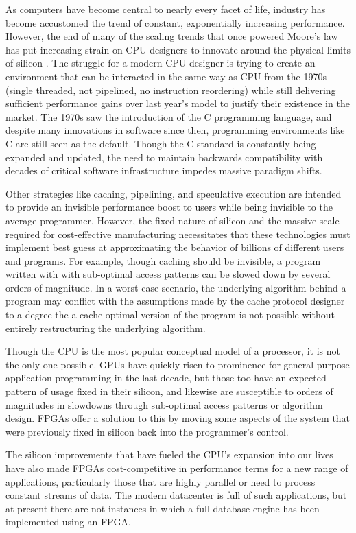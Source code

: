 
As computers have become central to nearly every facet of life, industry has
become accustomed the trend of constant, exponentially increasing performance.
However, the end of many of the scaling trends that once powered Moore's law has
put increasing strain on CPU designers to innovate around the physical limits of
silicon \autocite{dark-silicon}.
%
The struggle for a modern CPU designer is trying to create an environment that
can be interacted in the same way as CPU from the 1970s (single threaded, not
pipelined, no instruction reordering) while still delivering sufficient
performance gains over last year's model to justify their existence in the
market. The 1970s saw the introduction of the C programming language, and
despite many innovations in software since then, programming environments like C
are still seen as the default. Though the C standard is constantly being
expanded and updated, the need to maintain backwards compatibility with decades
of critical software infrastructure impedes massive paradigm shifts.

Other strategies like caching, pipelining, and speculative execution are
intended to provide an invisible performance boost to users while being
invisible to the average programmer. However, the fixed nature of silicon and
the massive scale required for cost-effective manufacturing necessitates that
these technologies must implement best guess at approximating the behavior of
billions of different users and programs.
%
For example, though caching should be invisible, a program written with with
sub-optimal access patterns can be slowed down by several orders of magnitude.
In a worst case scenario, the underlying algorithm behind a program may conflict
with the assumptions made by the cache protocol designer to a degree the a
cache-optimal version of the program is not possible without entirely
restructuring the underlying algorithm.

Though the CPU is the most popular conceptual model of a processor, it is
not the only one possible. GPUs have quickly risen to prominence for general
purpose application programming in the last decade, but those too have an
expected pattern of usage fixed in their silicon, and likewise are susceptible
to orders of magnitudes in slowdowns through sub-optimal access patterns or
algorithm design. FPGAs offer a solution to this by moving some aspects of the
system that were previously fixed in silicon back into the programmer's control.

The silicon improvements that have fueled the CPU's expansion into our lives
have also made FPGAs cost-competitive in performance terms for a new range of
applications, particularly those that are highly parallel or need to
process constant streams of data. The modern datacenter is full of such
applications, but at present there are not instances in which a full database
engine has been implemented using an FPGA.
